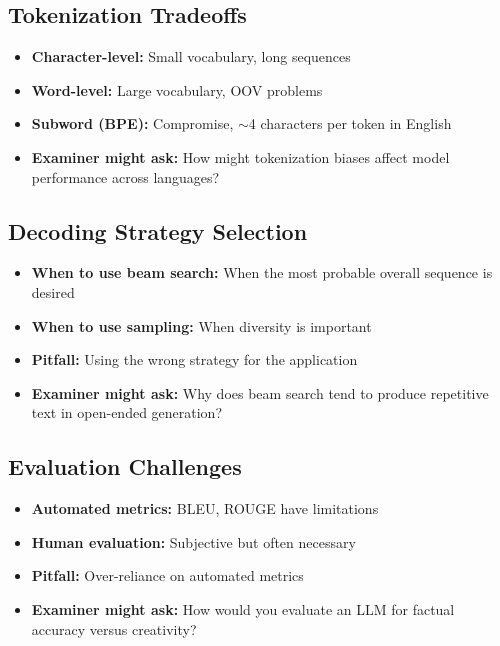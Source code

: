 \subsection*{Tokenization Tradeoffs}
\begin{itemize}
    \item \textbf{Character-level:} Small vocabulary, long sequences
    \item \textbf{Word-level:} Large vocabulary, OOV problems
    \item \textbf{Subword (BPE):} Compromise, $\sim$4 characters per token in English
    \item \textbf{Examiner might ask:} How might tokenization biases affect model performance across languages?
\end{itemize}

\subsection*{Decoding Strategy Selection}
\begin{itemize}
    \item \textbf{When to use beam search:} When the most probable overall sequence is desired
    \item \textbf{When to use sampling:} When diversity is important
    \item \textbf{Pitfall:} Using the wrong strategy for the application
    \item \textbf{Examiner might ask:} Why does beam search tend to produce repetitive text in open-ended generation?
\end{itemize}

\subsection*{Evaluation Challenges}
\begin{itemize}
    \item \textbf{Automated metrics:} BLEU, ROUGE have limitations
    \item \textbf{Human evaluation:} Subjective but often necessary
    \item \textbf{Pitfall:} Over-reliance on automated metrics
    \item \textbf{Examiner might ask:} How would you evaluate an LLM for factual accuracy versus creativity?
\end{itemize}
